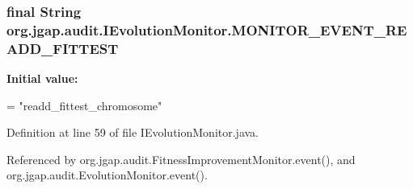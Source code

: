 \hypertarget{interfaceorg_1_1jgap_1_1audit_1_1_i_evolution_monitor_ac9fbd726604f3e1949e158dbf5662c91}{
\subsubsection[{M\-O\-N\-I\-T\-O\-R\-\_\-\-E\-V\-E\-N\-T\-\_\-\-R\-E\-A\-D\-D\-\_\-\-F\-I\-T\-T\-E\-S\-T}]{\setlength{\rightskip}{0pt plus 5cm}final String org.\-jgap.\-audit.\-I\-Evolution\-Monitor.\-M\-O\-N\-I\-T\-O\-R\-\_\-\-E\-V\-E\-N\-T\-\_\-\-R\-E\-A\-D\-D\-\_\-\-F\-I\-T\-T\-E\-S\-T\hspace{0.3cm}{\ttfamily [static]}}}\label{interfaceorg_1_1jgap_1_1audit_1_1_i_evolution_monitor_ac9fbd726604f3e1949e158dbf5662c91}
{\bfseries Initial value\-:}
\begin{DoxyCode}
=
      \textcolor{stringliteral}{"readd\_fittest\_chromosome"}
\end{DoxyCode}


Definition at line 59 of file I\-Evolution\-Monitor.\-java.



Referenced by org.\-jgap.\-audit.\-Fitness\-Improvement\-Monitor.\-event(), and org.\-jgap.\-audit.\-Evolution\-Monitor.\-event().

